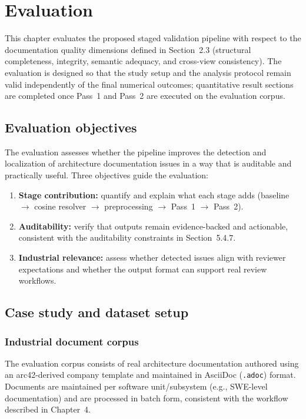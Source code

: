 \section{Evaluation}
\label{sec:evaluation}

This chapter evaluates the proposed staged validation pipeline with respect to the documentation quality dimensions defined in Section~2.3 (structural completeness, integrity, semantic adequacy, and cross-view consistency). The evaluation is designed so that the study setup and the analysis protocol remain valid independently of the final numerical outcomes; quantitative result sections are completed once Pass~1 and Pass~2 are executed on the evaluation corpus.

\subsection{Evaluation objectives}
\label{sec:eval_objectives}

The evaluation assesses whether the pipeline improves the detection and localization of architecture documentation issues in a way that is auditable and practically useful. Three objectives guide the evaluation:

\begin{enumerate}
    \item \textbf{Stage contribution:} quantify and explain what each stage adds (baseline $\rightarrow$ cosine resolver $\rightarrow$ preprocessing $\rightarrow$ Pass~1 $\rightarrow$ Pass~2).
    \item \textbf{Auditability:} verify that outputs remain evidence-backed and actionable, consistent with the auditability constraints in Section~5.4.7.
    \item \textbf{Industrial relevance:} assess whether detected issues align with reviewer expectations and whether the output format can support real review workflows.
\end{enumerate}

\subsection{Case study and dataset setup}
\label{sec:eval_dataset}

\subsubsection{Industrial document corpus}
\label{sec:eval_corpus}

The evaluation corpus consists of real architecture documentation authored using an arc42-derived company template and maintained in AsciiDoc (\texttt{.adoc}) format. Documents are maintained per software unit/subsystem (e.g., SWE-level documentation) and are processed in batch form, consistent with the workflow described in Chapter~4.

